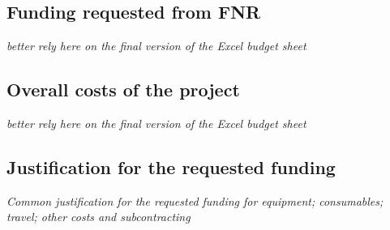 % 

\subsection{Funding requested from FNR}
\emph{better rely here on the final version of the Excel budget sheet }

\subsection{Overall costs of the project}
\emph{better rely here on the final version of the Excel budget sheet }


\subsection{Justification for the requested funding}

\emph{Common justification for the requested funding for equipment; consumables; travel; other costs and subcontracting}








%
